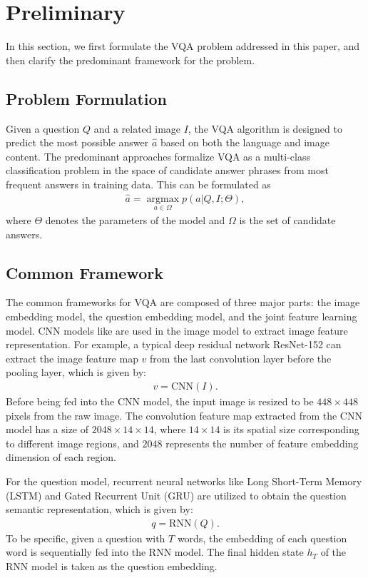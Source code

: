 \documentclass[sigconf]{acmart}
\begin{document}
\section{Preliminary}

In this section, we first formulate the VQA problem addressed in this paper, and then clarify the predominant framework for the problem.

\subsection{Problem Formulation}
Given a question $Q$ and a related image $I$, the VQA algorithm is designed to predict the most possible answer $\hat{a}$ based on both the language and image content. The predominant approaches formalize VQA as a multi-class classification problem in the space of candidate answer phrases from most frequent answers in training data. This can be formulated as
\begin{align}
	\hat{a} = \mathop{\arg\max}\limits_{a \in \Omega}  p(a|Q,I; \varTheta) ,
\end{align}
where $\varTheta$ denotes the parameters of the model and $\Omega$ is the set of candidate answers.

\subsection{Common Framework}
The common frameworks for VQA are composed of three major parts: the image embedding model, the question embedding model, and the joint feature learning model. CNN models like \cite{simonyan2014very,he2016deep} are used in the image model to extract image feature representation. For example, a typical deep residual network ResNet-152 \cite{he2016deep} can extract the image feature map $v$  from the last convolution layer before the pooling layer, which is given by:
\begin{align}
	v= \mathrm{CNN}(I) .
\end{align}
Before being fed into the CNN model, the input image is resized to be $448\times448$ pixels from the raw image.
The convolution feature map extracted from the CNN model has a size of $2048\times14\times14$, where $14\times14$ is its spatial size corresponding to different image regions, and $2048$ represents the number of feature embedding dimension of each region.

For the question model, recurrent neural networks like Long Short-Term Memory (LSTM) \cite{hochreiter1997long} and Gated Recurrent Unit (GRU) \cite{cho2014learning} are utilized to obtain the question semantic representation, which is given by:
\begin{align}
	q = \mathrm{RNN}(Q) .
\end{align}
To be specific, given a question with $T$ words, the embedding of each question word is sequentially fed into the RNN model. The final hidden state $h_T $ of the RNN model is taken as the question embedding.
\end{document}
